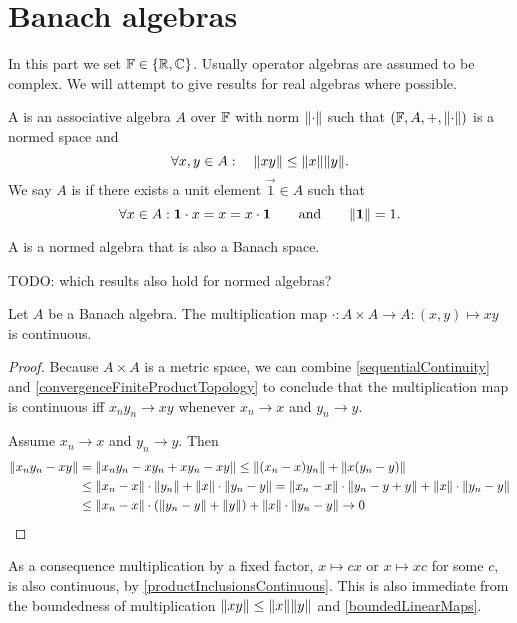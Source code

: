 \chapter{Banach algebras}
In this part we set $\mathbb{F} \in \{\mathbb{R}, \mathbb{C}\}$. Usually operator algebras are assumed to be complex. We will attempt to give results for real algebras where possible.
\begin{definition}
A  is an associative algebra $A$ over $\mathbb{F}$ with norm $\lVert\cdot\rVert$ such that $(\mathbb{F}, A,+, \lVert\cdot\rVert)$ is a normed space and
\[ \forall x,y\in A: \quad \lVert xy\rVert\leq\lVert x\rVert\lVert y\rVert. \]
We say $A$ is  if there exists a unit element $\vec{1}\in A$ such that
\[ \forall x\in A: \boldsymbol{\mathrm{1}}\cdot x = x = x\cdot \boldsymbol{\mathrm{1}} \qquad \text{and} \qquad \lVert\boldsymbol{\mathrm{1}}\rVert = 1. \]
\end{definition}
\begin{definition}
A  is a normed algebra that is also a Banach space.
\end{definition}
TODO: which results also hold for normed algebras?

\begin{lemma} \label{multiplicationContinuous}
Let $A$ be a Banach algebra. The multiplication map $\cdot: A\times A \to A: (x,y)\mapsto xy$ is continuous.
\end{lemma}
\begin{proof}
Because $A\times A$ is a metric space, we can combine \ref{sequentialContinuity} and \ref{convergenceFiniteProductTopology} to conclude that the multiplication map is continuous iff $x_ny_n \to xy$ whenever $x_n \to x$ and $y_n \to y$.

Assume $x_n \to x$ and $y_n \to y$. Then
\begin{align*}
\lVert x_ny_n - xy\rVert &= \lVert x_ny_n - xy_n + xy_n - xy\rVert \leq \lVert(x_n-x)y_n\rVert+ \lVert x(y_n-y)\rVert\\ 
&\leq \lVert x_n-x\rVert\cdot\lVert y_n\rVert+ \lVert x\rVert\cdot\lVert y_n-y\rVert = \lVert x_n-x\rVert\cdot\lVert y_n-y+y\rVert+ \lVert x\rVert\cdot\lVert y_n-y\rVert\\
&\leq \lVert x_n-x\rVert\cdot(\lVert y_n-y\rVert + \lVert y\rVert)+ \lVert x\rVert\cdot\lVert y_n-y\rVert \to 0
\end{align*}
\end{proof}
As a consequence multiplication by a fixed factor, $x\mapsto cx$ or $x\mapsto xc$ for some $c$, is also continuous, by \ref{productInclusionsContinuous}. This is also immediate from the boundedness of multiplication $\lVert xy\rVert\leq\lVert x\rVert\lVert y\rVert$ and \ref{boundedLinearMaps}.

